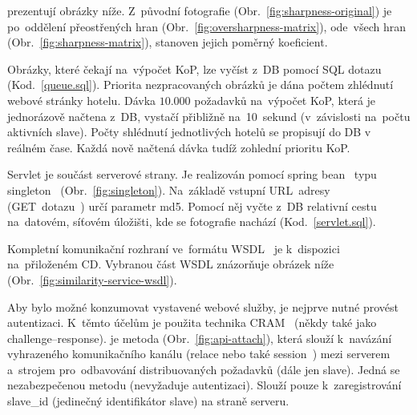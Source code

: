 

prezentují obrázky níže. Z~původní fotografie (Obr.~\ref{fig:sharpness-original}) je po~oddělení přeostřených hran (Obr.~\ref{fig:oversharpness-matrix}), ode~všech hran (Obr.~\ref{fig:sharpness-matrix}), stanoven jejich poměrný koeficient.


Obrázky, které čekají na~výpočet KoP, lze vyčíst z~DB pomocí SQL dotazu (Kod.~\ref{queue.sql}). Priorita nezpracovaných obrázků je dána počtem zhlédnutí webové stránky hotelu. Dávka $ 10.000 $ požadavků na~výpočet KoP, která je jednorázově načtena z~DB, vystačí přibližně na~10~sekund (v~závislosti na~počtu aktivních slave). Počty shlédnutí jednotlivých hotelů se propisují do DB v reálném čase. Každá nově načtená dávka tudíž zohlední prioritu KoP.


Servlet je součást serverové strany. Je realizován pomocí spring bean~\cite{bean} typu singleton~\cite{SpringInAction} (Obr.~\ref{fig:singleton}). Na~základě vstupní URL~adresy~\cite{url} (GET~dotazu~\cite{get}) určí parametr md5. Pomocí něj vyčte z~DB relativní cestu na~datovém, síťovém úložišti, kde se fotografie nachází (Kod.~\ref{servlet.sql}).


Kompletní komunikační rozhraní ve~formátu WSDL~\cite{wsdl} je k~dispozici na~přiloženém CD. Vybranou část WSDL znázorňuje obrázek níže (Obr.~\ref{fig:similarity-service-wsdl}).


Aby bylo možné konzumovat vystavené webové služby, je nejprve nutné provést autentizaci. K~těmto účelům je použita technika CRAM~\cite{challenge-response} (někdy také jako challenge--response).
je metoda (Obr.~\ref{fig:api-attach}), která slouží k~navázání vyhrazeného komunikačního kanálu (relace nebo také session~\cite{session}) mezi serverem a~strojem pro~odbavování distribuovaných požadavků (dále jen slave). Jedná se nezabezpečenou metodu (nevyžaduje autentizaci). Slouží pouze k~zaregistrování slave\_id (jedinečný identifikátor slave) na straně serveru.

